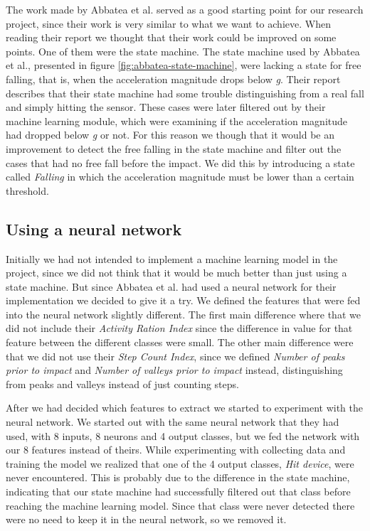 \documentclass[12pt, a4paper, onecolumn]{article}
\begin{document}
	The work made by Abbatea et al. served as a good starting point for our research project, since their work is very similar to what we want to achieve. When reading their report we thought that their work could be improved on some points. One of them were the state machine. The state machine used by Abbatea et al., presented in figure \ref{fig:abbatea-state-machine}, were lacking a state for free falling, that is, when the acceleration magnitude drops below \textit{g}. Their report describes that their state machine had some trouble distinguishing from a real fall and simply hitting the sensor. These cases were later filtered out by their machine learning module, which were examining if the acceleration magnitude had dropped below \textit{g} or not. For this reason we though that it would be an improvement to detect the free falling in the state machine and filter out the cases that had no free fall before the impact. We did this by introducing a state called \textit{Falling} in which the acceleration magnitude must be lower than a certain threshold.
	
	\subsection{Using a neural network}
	
	Initially we had not intended to implement a machine learning model in the project, since we did not think that it would be much better than just using a state machine. But since Abbatea et al. had used a neural network for their implementation we decided to give it a try. We defined the features that were fed into the neural network slightly different. The first main difference where that we did not include their \textit{Activity Ration Index} since the difference in value for that feature between the different classes were small. The other main difference were that we did not use their \textit{Step Count Index}, since we defined \textit{Number of peaks prior to impact} and \textit{Number of valleys prior to impact} instead, distinguishing from peaks and valleys instead of just counting steps. 
	
	After we had decided which features to extract we started to experiment with the neural network. We started out with the same neural network that they had used, with 8 inputs, 8 neurons and 4 output classes, but we fed the network with our 8 features instead of theirs. While experimenting with collecting data and training the model we realized that one of the 4 output classes, \textit{Hit device}, were never encountered. This is probably due to the difference in the state machine, indicating that our state machine had successfully filtered out that class before reaching the machine learning model. Since that class were never detected there were no need to keep it in the neural network, so we removed it.
	
\end{document}
